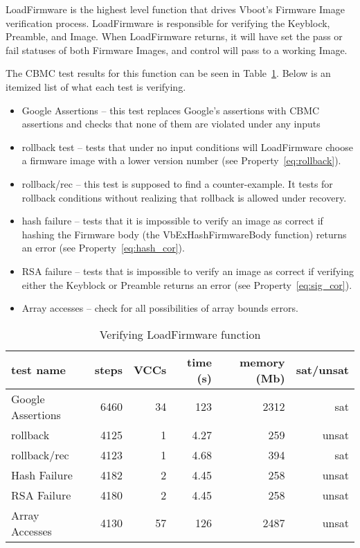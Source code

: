 LoadFirmware is the highest level function that drives Vboot's Firmware Image
verification process.
LoadFirmware is responsible for verifying the Keyblock, Preamble, and Image.
When LoadFirmware returns, it will have set the pass or fail statuses of both Firmware Images, and control will pass to a working Image.

The CBMC test results for this function can be seen in Table~\ref{ldfw_results}. 
Below is an itemized list of what each test is verifying.

\begin{itemize}
 \item  Google Assertions -- this test replaces Google's assertions with CBMC assertions and checks that none of them are violated under any inputs
 \item  rollback test -- tests that under no input conditions will LoadFirmware choose a firmware image with a lower version number (see Property~\ref{eq:rollback}).
 \item  rollback/rec  -- this test is supposed to find a counter-example. It tests for rollback conditions without realizing that rollback is allowed under recovery. 
 \item  hash failure -- tests that it is impossible to verify an image as correct  if hashing the Firmware body (the VbExHashFirmwareBody function) returns an error (see Property~\ref{eq:hash_cor}).
 \item  RSA failure -- tests that is impossible to verify an image as correct if verifying either the Keyblock or Preamble returns an error (see Property~\ref{eq:sig_cor}).
 \item  Array accesses -- check for all possibilities of array bounds errors.
\end{itemize}

\begin{table}[!htbp]
    \centering
    \caption{Verifying LoadFirmware function}\label{ldfw_results}
    \begin{tabular}{lrrrrr}
        \toprule
        test name & steps & VCCs  & time (s) & memory (Mb) & sat/unsat  \\ \midrule
        Google Assertions & 6460 & 34 & 123 & 2312 & sat \\
        rollback     & 4125 & 1 & 4.27 & 259 & unsat \\
        rollback/rec & 4123 & 1 & 4.68 & 394 & sat \\
        Hash Failure & 4182 & 2 & 4.45 & 258 & unsat \\
        RSA  Failure & 4180 & 2 & 4.45 & 258 & unsat \\
        Array Accesses & 4130 & 57 & 126 & 2487 & unsat \\\bottomrule
    \end{tabular}
\end{table}

